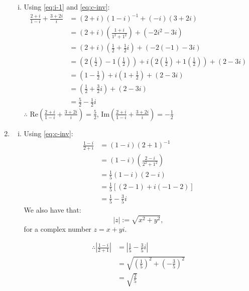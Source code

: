 \documentclass[a4paper, titlepage, DIV=14]{scrartcl}
\begin{document}
\begin{enumerate}
\begin{enumerate}[i)]
            \item Using \autoref{eq:i-1} and \autoref{eq:c-inv}:
            \begin{align*}
                \frac{2+i}{1-i} + \frac{3+2i}{i} &= (2+i)(1-i)^{-1} + (-i)(3+2i)\\
                        &= (2+i)(\frac{1+i}{1^{2}+1^{2}}) + (-2i^{2}-3i) \\
                        &= (2+i)(\frac{1}{2} + \frac{1}{2}i) + (-2(-1)-3i) \\
                        &= (2(\frac{1}{2})-1(\frac{1}{2})) + i (2(\frac{1}{2})+1(\frac{1}{2}))
                        + (2-3i) \\
                        &= (1-\frac{1}{2}) + i(1+\frac{1}{2}) + (2-3i) \\
                        &= (\frac{1}{2} + \frac{3}{2}i) + (2 - 3i) \\
                        &= \frac{5}{2} - \frac{1}{2}i
            \end{align*}
            $\therefore$ Re$(\frac{2+i}{1-i} + \frac{3+2i}{i})=\frac{5}{2}$, 
                Im$(\frac{2+i}{1-i} + \frac{3+2i}{i})= -\frac{1}{2}$ \\
        \end{enumerate}

        \item 
        \begin{enumerate}[i)]
            \item Using \autoref{eq:c-inv}:
            \begin{align*}
                \frac{1-i}{2+i} &= (1-i)(2+1)^{-1} \\
                                &= (1-i)(\frac{2-i}{2^{2}+1^{2}}) \\
                                &= \frac{1}{5}(1-i)(2-i) \\
                                &= \frac{1}{5}[(2-1)+i(-1-2)] \\
                                &= \frac{1}{5}-\frac{3}{5}i
            \end{align*}
        We also have that:
        \begin{equation}
            |z| := \sqrt{x^{2}+y^{2}}, \label{eq:abs-z}
        \end{equation}
        for a complex number $z = x+yi$.

        \begin{align*}
            \therefore |\frac{1-i}{2+1}| &= |\frac{1}{5}-\frac{3}{5}i| \\
                        &= \sqrt{(\frac{1}{5})^{2}+(-\frac{3}{5})^{2}} \\
                        &= \sqrt{\frac{2}{5}}
        \end{align*}


\end{enumerate}
\end{enumerate}
\end{document}
